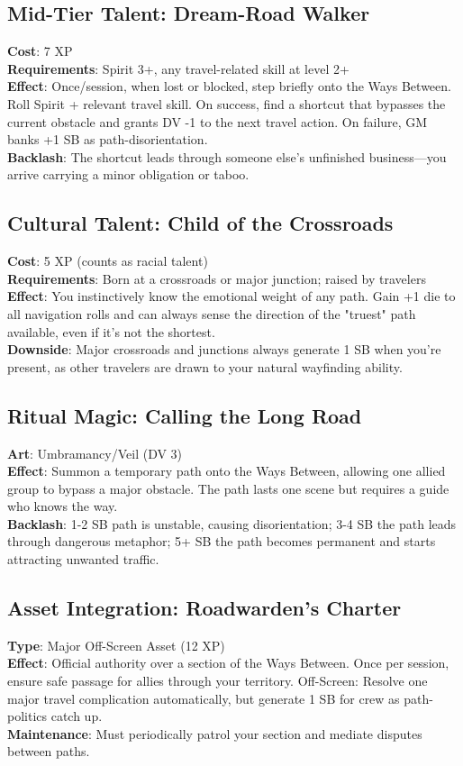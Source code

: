 \subsection*{Mid-Tier Talent: Dream-Road Walker}
\textbf{Cost}: 7 XP \\
\textbf{Requirements}: Spirit 3+, any travel-related skill at level 2+ \\
\textbf{Effect}: Once/session, when lost or blocked, step briefly onto the Ways Between. Roll Spirit + relevant travel skill. On success, find a shortcut that bypasses the current obstacle and grants DV -1 to the next travel action. On failure, GM banks +1 SB as path-disorientation. \\
\textbf{Backlash}: The shortcut leads through someone else's unfinished business---you arrive carrying a minor obligation or taboo.

\subsection*{Cultural Talent: Child of the Crossroads}
\textbf{Cost}: 5 XP (counts as racial talent) \\
\textbf{Requirements}: Born at a crossroads or major junction; raised by travelers \\
\textbf{Effect}: You instinctively know the emotional weight of any path. Gain +1 die to all navigation rolls and can always sense the direction of the "truest" path available, even if it's not the shortest. \\
\textbf{Downside}: Major crossroads and junctions always generate 1 SB when you're present, as other travelers are drawn to your natural wayfinding ability.

\subsection*{Ritual Magic: Calling the Long Road}
\textbf{Art}: Umbramancy/Veil (DV 3) \\
\textbf{Effect}: Summon a temporary path onto the Ways Between, allowing one allied group to bypass a major obstacle. The path lasts one scene but requires a guide who knows the way. \\
\textbf{Backlash}: 1-2 SB path is unstable, causing disorientation; 3-4 SB the path leads through dangerous metaphor; 5+ SB the path becomes permanent and starts attracting unwanted traffic.

\subsection*{Asset Integration: Roadwarden's Charter}
\textbf{Type}: Major Off-Screen Asset (12 XP) \\
\textbf{Effect}: Official authority over a section of the Ways Between. Once per session, ensure safe passage for allies through your territory. Off-Screen: Resolve one major travel complication automatically, but generate 1 SB for crew as path-politics catch up. \\
\textbf{Maintenance}: Must periodically patrol your section and mediate disputes between paths.

